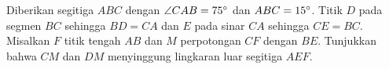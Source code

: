 Diberikan segitiga $ABC$ dengan $\angle CAB = 75^\circ$ dan $ABC=15^\circ$. Titik $D$ pada segmen $BC$ sehingga $BD=CA$ dan $E$ pada sinar $CA$ sehingga $CE=BC$. Misalkan $F$ titik tengah $AB$ dan $M$ perpotongan $CF$ dengan $BE$. Tunjukkan bahwa $CM$ dan $DM$ menyinggung lingkaran luar segitiga $AEF$.
